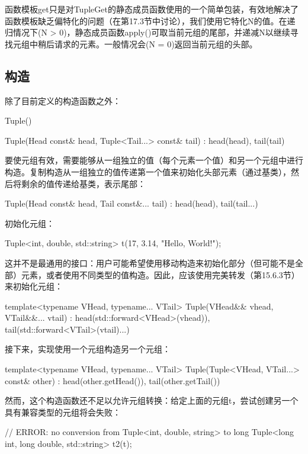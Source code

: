 函数模板get只是对TupleGet的静态成员函数使用的一个简单包装，有效地解决了函数模板缺乏偏特化的问题（在第17.3节中讨论），我们使用它特化N的值。在递归情况下(N > 0)，静态成员函数apply()可取当前元组的尾部，并递减N以继续寻找元组中稍后请求的元素。一般情况会(N = 0)返回当前元组的头部。

\subsection{构造}

除了目前定义的构造函数之外：

\begin{cpp}
Tuple() {}

Tuple(Head const& head, Tuple<Tail...> const& tail)
: head(head), tail(tail) {}
\end{cpp}

要使元组有效，需要能够从一组独立的值（每个元素一个值）和另一个元组中进行构造。复制构造从一组独立的值传递第一个值来初始化头部元素（通过基类），然后将剩余的值传递给基类，表示尾部：

\begin{cpp}
Tuple(Head const& head, Tail const&... tail)
: head(head), tail(tail...) {}
\end{cpp}

初始化元组：

\begin{cpp}
Tuple<int, double, std::string> t(17, 3.14, "Hello, World!");
\end{cpp}

这并不是最通用的接口：用户可能希望使用移动构造来初始化部分（但可能不是全部）元素，或者使用不同类型的值构造。因此，应该使用完美转发（第15.6.3节）来初始化元组：

\begin{cpp}
template<typename VHead, typename... VTail>
Tuple(VHead&& vhead, VTail&&... vtail)
	: head(std::forward<VHead>(vhead)),
		tail(std::forward<VTail>(vtail)...) {}
\end{cpp}

接下来，实现使用一个元组构造另一个元组：

\begin{cpp}
template<typename VHead, typename... VTail>
Tuple(Tuple<VHead, VTail...> const& other)
: head(other.getHead()), tail(other.getTail()) { }
\end{cpp}

然而，这个构造函数还不足以允许元组转换：给定上面的元组t，尝试创建另一个具有兼容类型的元组将会失败：

\begin{cpp}
// ERROR: no conversion from Tuple<int, double, string> to long
Tuple<long int, long double, std::string> t2(t);
\end{cpp}

